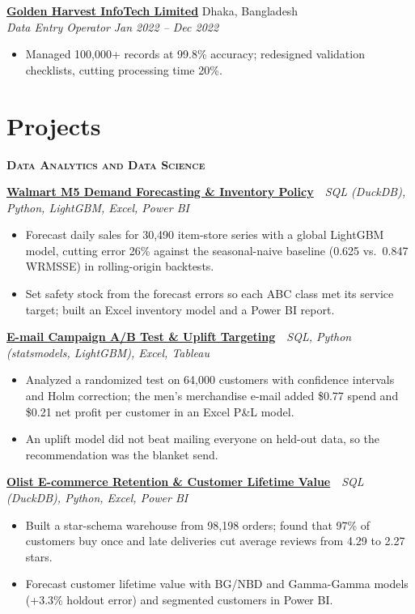 \documentclass[10pt, letterpaper]{article}
\newcommand{\workentry}[4]{%
    \textbf{#1} \hfill {\small #2}\\[-1pt]%
    \textit{#3} \hfill {\small\textit{#4}}%
}
\newcommand{\project}[3]{%
    \textbf{\href{#2}{#1}} \,\textbar\, {\small\textit{#3}}%
}
\newcommand{\subhead}[1]{%
    {\small\bfseries\scshape #1}\par\vspace{1pt}%
}
\begin{document}
\vspace{3pt}
\workentry{\href{https://www.ghitbd.com}{Golden Harvest InfoTech Limited}}{Dhaka, Bangladesh}%
{Data Entry Operator}{Jan 2022 -- Dec 2022}
\begin{itemize}
    \item Managed 100,000+ records at 99.8\% accuracy; redesigned validation checklists, cutting processing
          time 20\%.
\end{itemize}

\section{Projects}

\subhead{Data Analytics and Data Science}

\project{Walmart M5 Demand Forecasting \& Inventory Policy}%
{https://github.com/SameeulKhondokerJisan/walmart-demand-forecasting-inventory}%
{SQL (DuckDB), Python, LightGBM, Excel, Power BI}
\begin{itemize}
    \item Forecast daily sales for 30,490 item-store series with a global LightGBM model, cutting error 26\%
          against the seasonal-naive baseline (0.625 vs.\ 0.847 WRMSSE) in rolling-origin backtests.
    \item Set safety stock from the forecast errors so each ABC class met its service target; built an Excel
          inventory model and a Power BI report.
\end{itemize}

\vspace{3pt}
\project{E-mail Campaign A/B Test \& Uplift Targeting}%
{https://github.com/SameeulKhondokerJisan/email-campaign-ab-test-uplift}%
{SQL, Python (statsmodels, LightGBM), Excel, Tableau}
\begin{itemize}
    \item Analyzed a randomized test on 64,000 customers with confidence intervals and Holm correction; the
          men's merchandise e-mail added \$0.77 spend and \$0.21 net profit per customer in an Excel P\&L model.
    \item An uplift model did not beat mailing everyone on held-out data, so the recommendation was the
          blanket send.
\end{itemize}

\vspace{3pt}
\project{Olist E-commerce Retention \& Customer Lifetime Value}%
{https://github.com/SameeulKhondokerJisan/olist-ecommerce-retention-analytics}%
{SQL (DuckDB), Python, Excel, Power BI}
\begin{itemize}
    \item Built a star-schema warehouse from 98,198 orders; found that 97\% of customers buy once and late
          deliveries cut average reviews from 4.29 to 2.27 stars.
    \item Forecast customer lifetime value with BG/NBD and Gamma-Gamma models (+3.3\% holdout error) and
          segmented customers in Power BI.
\end{itemize}
\end{document}
